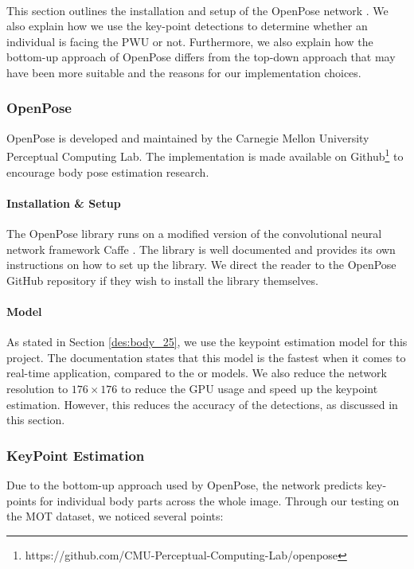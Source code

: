 \paragraph{} This section outlines the installation and setup of the OpenPose network \cite{Shao}. We also explain how we use the key-point detections to determine whether an individual is facing the PWU or not. Furthermore, we also explain how the bottom-up approach of OpenPose differs from the top-down approach that may have been more suitable and the reasons for our implementation choices.

\subsubsection{OpenPose}
OpenPose is developed and maintained by the Carnegie Mellon University Perceptual Computing Lab. The implementation is made available on Github\footnote{https://github.com/CMU-Perceptual-Computing-Lab/openpose} to encourage body pose estimation research.

\paragraph{Installation \& Setup} The OpenPose library runs on a modified version of the convolutional neural network framework Caffe \cite{Jia}. The library is well documented and provides its own instructions on how to set up the library. We direct the reader to the OpenPose GitHub repository if they wish to install the library themselves.

\paragraph{Model} As stated in Section \ref{des:body_25}, we use the  keypoint estimation model for this project. The documentation states that this model is the fastest when it comes to real-time application, compared to the  or  models. We also reduce the network resolution to $176\times 176$ to reduce the GPU usage and speed up the keypoint estimation. However, this reduces the accuracy of the detections, as discussed in this section.

\subsubsection{KeyPoint Estimation} \label{sec:bottomUp} 
Due to the bottom-up approach used by OpenPose, the network predicts key-points for individual body parts across the whole image. Through our testing on the MOT dataset, we noticed several points:

